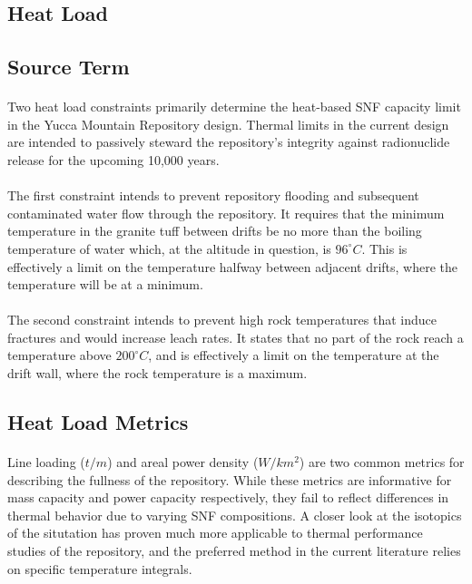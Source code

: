 \subsection{Heat Load}




\subsection{Source Term}


  
\paragraph{}
Two heat load constraints primarily determine the heat-based SNF capacity limit in the Yucca 
Mountain Repository design. Thermal limits in the current design are intended to passively steward 
the repository's integrity against radionuclide release for the upcoming 10,000 years.
\paragraph{}
The first constraint intends to prevent repository flooding and subsequent contaminated water flow 
through the repository. It requires that the minimum temperature in the granite tuff between drifts 
be no more than the boiling temperature of water which, at the altitude in question, is 
$96^{\circ}C$. This is effectively a limit on the temperature halfway between adjacent drifts, where 
the temperature will be at a minimum.
\paragraph{}
The second constraint intends to prevent high rock temperatures that induce fractures and would 
increase leach rates. It states that no part of the rock reach a temperature above $200^{\circ}C$, 
and is effectively a limit on the temperature at the drift wall, where the rock temperature is a 
maximum.  \subsection{Heat Load Metrics}
\paragraph{}
Line loading ($t/m$) and areal power density ($W/km^2$) are two common metrics for describing the 
fullness of the repository. While these metrics are informative for mass capacity and power capacity 
respectively, they fail to reflect differences in thermal behavior due to varying SNF compositions. 
A closer look at the isotopics of the situtation has proven much more applicable to thermal 
performance studies of the repository, and the preferred method in the current literature relies on 
specific temperature integrals.
